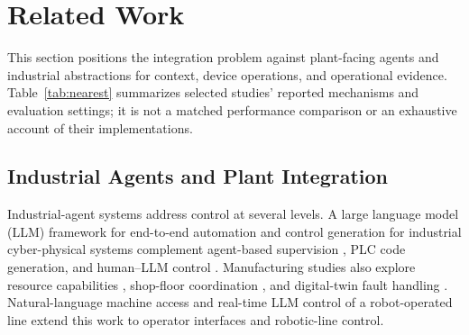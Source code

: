 \section{Related Work}
\label{sec:related}
This section positions the integration problem against plant-facing agents
and industrial abstractions for context, device operations, and operational
evidence. Table~\ref{tab:nearest} summarizes selected studies' reported
mechanisms and evaluation settings; it is not a matched performance
comparison or an exhaustive account of their implementations.

\subsection{Industrial Agents and Plant Integration}
Industrial-agent systems address control at several levels. A large language
model (LLM) framework for end-to-end automation \cite{xia2025control} and
control generation for industrial cyber-physical systems \cite{huang2026made}
complement agent-based supervision \cite{biskupovic2025supervision}, PLC
code generation, and human--LLM control
\cite{liu2026agents4plc,wu2025instructmpc}. Manufacturing studies also explore
resource capabilities \cite{lim2025llmenabled}, shop-floor coordination
\cite{zhao2026shopfloor}, and digital-twin fault handling
\cite{gill2025llmdt}. Natural-language machine access \cite{hofmann2025nlc}
and real-time LLM control of a robot-operated line
\cite{waseem2026pretrained} extend this work to operator interfaces and
robotic-line control.

